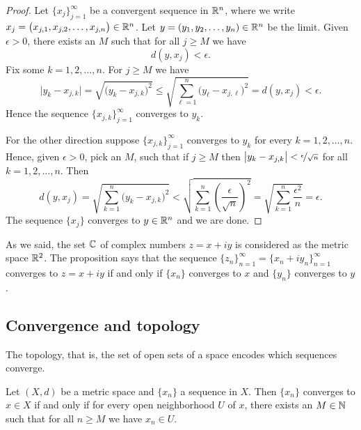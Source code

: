 \begin{proof}
Let $\{ x_j \}_{j=1}^\infty$ be a convergent sequence
in ${\mathbb{R}}^n$, where we write $x_j = \bigl(x_{j,1},x_{j,2},\ldots,x_{j,n}\bigr) \in {\mathbb{R}}^n$.
Let $y = (y_1,y_2,\ldots,y_n) \in {\mathbb{R}}^n$ be the limit.
Given $\epsilon > 0$, there exists an $M$ such that for all
$j \geq M$ we have
\begin{equation*}
d(y,x_j) < \epsilon.
\end{equation*}
Fix some $k=1,2,\ldots,n$.  For $j \geq M$ we have
\begin{equation*}
\bigl\lvert y_k - x_{j,k} \bigr\rvert
=
\sqrt{{\bigl(y_k - x_{j,k} \bigr)}^2}
\leq
\sqrt{\sum_{\ell=1}^n {\bigl(y_\ell-x_{j,\ell}\bigr)}^2}
= d(y,x_j) < \epsilon .
\end{equation*}
Hence the sequence $\{ x_{j,k} \}_{j=1}^\infty$ converges to $y_k$.

For the other direction suppose 
$\{ x_{j,k} \}_{j=1}^\infty$ converges to $y_k$ for every $k=1,2,\ldots,n$.
Hence, given $\epsilon > 0$, pick an $M$, such that if $j \geq M$ then 
$\bigl\lvert y_k-x_{j,k} \bigr\rvert < \nicefrac{\epsilon}{\sqrt{n}}$ for all
$k=1,2,\ldots,n$.  Then
\begin{equation*}
d(y,x_j)
=
\sqrt{\sum_{k=1}^n {\bigl(y_k-x_{j,k}\bigr)}^2}
<
\sqrt{\sum_{k=1}^n {\left(\frac{\epsilon}{\sqrt{n}}\right)}^2}
=
\sqrt{\sum_{k=1}^n \frac{{\epsilon^2}}{n}}
= \epsilon .
\end{equation*}
The sequence $\{ x_j \}$ converges to $y \in {\mathbb{R}}^n$ and we are done.
\end{proof}

\begin{example}
As we said, the set ${\mathbb{C}}$ of complex numbers $z = x+iy$ is considered 
as the metric space ${\mathbb{R}}^2$.  The proposition says that the
sequence $\{ z_n \}_{n=1}^\infty = \{ x_n + iy_n \}_{n=1}^\infty$ converges
to $z = x+iy$
if and only if $\{ x_n \}$ converges to $x$ and 
$\{ y_n \}$ converges to $y$.
\end{example}

\subsection{Convergence and topology}

The topology, that is, the set of open sets of a space encodes which
sequences converge.

\begin{prop} \label{prop:msconvtopo}
Let $(X,d)$ be a metric space and $\{x_n\}$ a sequence in $X$.  Then
$\{ x_n \}$ converges to $x \in X$ if and only if for every open neighborhood
$U$ of $x$, there exists an $M \in {\mathbb{N}}$ such that for all $n \geq M$
we have $x_n \in U$.
\end{prop}

